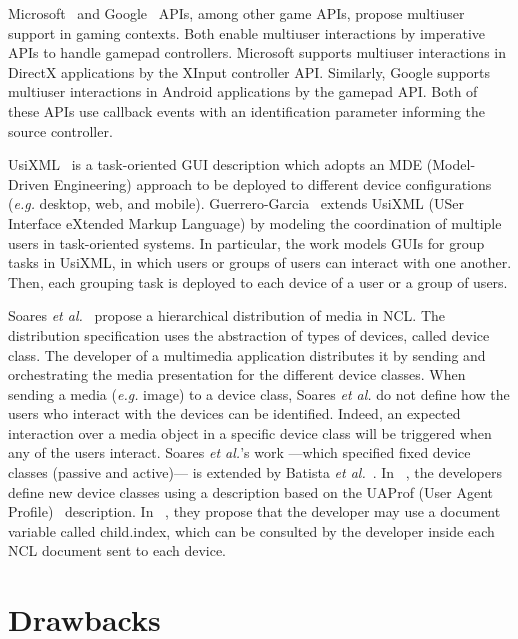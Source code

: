 Microsoft~\cite{microsoft_getting_nodate} and
Google~\cite{google_supporting_nodate} APIs, among other game
APIs, propose multiuser support in gaming contexts. Both enable multiuser
interactions by imperative APIs to handle gamepad controllers. Microsoft
supports multiuser interactions in DirectX applications by the XInput controller
API. Similarly, Google supports multiuser interactions in Android applications
by the gamepad API. Both of these APIs use callback events with an
identification parameter informing the source controller.

UsiXML~\cite{limbourg_usixml:_2005} is a task-oriented GUI description which
adopts an MDE (Model-Driven Engineering) approach to be deployed to different
device configurations (\textit{e.g.} desktop, web, and mobile).
Guerrero-Garcia~\cite{guerrero_garcia_designing_2010} extends UsiXML (USer
Interface eXtended Markup Language) by modeling the coordination of multiple
users in task-oriented systems. In particular, the work models GUIs for group
tasks in UsiXML, in which users or groups of users can interact with one
another. Then, each grouping task is deployed to each device of a user or a
group of users.

Soares \textit{et al.}~\cite{soares_multiple_2009} propose a hierarchical distribution
of media in NCL. The distribution specification uses the abstraction of types of
devices, called device class. The developer of a multimedia application
distributes it by sending and orchestrating the media presentation for the
different device classes. When sending a media (\textit{e.g.} image) to a device class,
Soares \textit{et al.} do not define how the users who interact with the devices can be
identified. Indeed, an expected interaction over a media object in a specific
device class will be triggered when any of the users interact. Soares
\textit{et al.}’s
work —which specified fixed device classes (passive and active)— is extended by
Batista \textit{et al.}~\cite{batista_estendendo_2010,batista_ginga-md:_2013}. In
~\cite{batista_estendendo_2010}, the developers define new device classes using
a description based on the UAProf (User Agent
Profile)~\cite{openmobilealliance_wag_2001} description. In
~\cite{batista_ginga-md:_2013}, they propose that the developer may use a
document variable called child.index, which can be consulted by the developer
inside each NCL document sent to each device.

\section{Drawbacks}
\label{sec:state:drawbacks}

